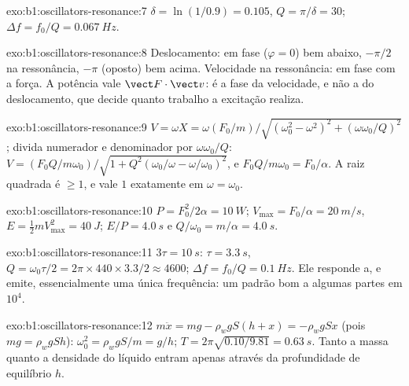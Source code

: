 \begin{solution}{exo:b1:oscillators-resonance:7}
$\delta = \ln(1/0.9) = 0.105$, $Q = \pi/\delta = 30$; $\Delta f = f_0/Q =
\qty{0.067}{Hz}$.
\end{solution}

\begin{solution}{exo:b1:oscillators-resonance:8}
Deslocamento: em fase ($\varphi = 0$) bem abaixo, $-\pi/2$ na
ressonância, $-\pi$ (oposto) bem acima. Velocidade na ressonância: em
fase com a força. A potência vale $\vect F\cdot\vect v$: é a fase da velocidade,
e não a do deslocamento, que decide quanto trabalho a excitação
realiza.
\end{solution}

\begin{solution}{exo:b1:oscillators-resonance:9}
$V = \omega X = \omega(F_0/m)/\sqrt{(\omega_0^2 - \omega^2)^2 + (\omega\omega_0/Q)^2}$;
divida numerador e denominador por $\omega\omega_0/Q$: $V = (F_0Q/m\omega_0)/
\sqrt{1 + Q^2(\omega_0/\omega - \omega/\omega_0)^2}$, e $F_0Q/m\omega_0 = F_0/\alpha$.
A raiz quadrada é $\geq 1$, e vale $1$ exatamente em $\omega = \omega_0$.
\end{solution}

\begin{solution}{exo:b1:oscillators-resonance:10}
$P = F_0^2/2\alpha = \qty{10}{W}$; $V_{\max} = F_0/\alpha = \qty{20}{m/s}$,
$E = \tfrac12 mV_{\max}^2 = \qty{40}{J}$; $E/P = \qty{4.0}{s}$ e $Q/\omega_0 =
m/\alpha = \qty{4.0}{s}$.
\end{solution}

\begin{solution}{exo:b1:oscillators-resonance:11}
$3\tau = \qty{10}{s}$: $\tau = \qty{3.3}{s}$, $Q = \omega_0\tau/2 = 2\pi \times
440 \times 3.3/2 \approx 4600$; $\Delta f = f_0/Q = \qty{0.1}{Hz}$. Ele
responde a, e emite, essencialmente uma única frequência: um padrão bom a
algumas partes em $10^4$.
\end{solution}

\begin{solution}{exo:b1:oscillators-resonance:12}
$m\ddot x = mg - \rho_wgS(h + x) = -\rho_wgSx$ (pois $mg = \rho_wgSh$):
$\omega_0^2 = \rho_wgS/m = g/h$; $T = 2\pi\sqrt{0.10/9.81} = \qty{0.63}{s}$.
Tanto a massa quanto a densidade do líquido entram apenas através da
profundidade de equilíbrio $h$.
\end{solution}

